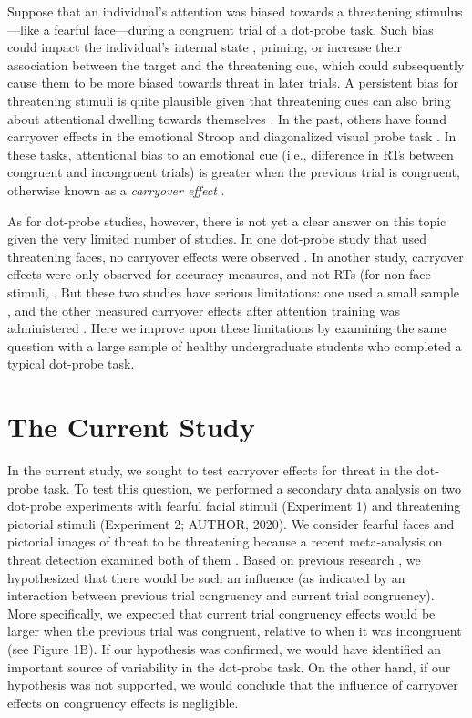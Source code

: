 \documentclass[issue,header,twocolumn,empirical, authordate,10pt]{jote-new-article}
\begin{document}
Suppose that an individual's attention was biased towards a threatening stimulus—like a fearful face—during a congruent trial of a dot-probe task. Such bias could impact the individual's internal state \parencite{Panksepp2011}, priming, or increase their association between the target and the threatening cue, which could subsequently cause them to be more biased towards threat in later trials. A persistent bias for threatening stimuli is quite plausible given that threatening cues can also bring about attentional dwelling towards themselves \parencite{Carlson2014, Fox2001}. In the past, others have found carryover effects in the emotional Stroop \parencite{Cane2009, Clarke2015, Waters2005, Wilson2007} and diagonalized visual probe task \parencite{Gladwin2019, Gladwin2020, Gladwin2019a}. In these tasks, attentional bias to an emotional cue (i.e., difference in RTs between congruent and incongruent trials) is greater when the previous trial is congruent, otherwise known as a \emph{carryover effect } \parencite{Gladwin2019}.



As for dot-probe studies, however, there is not yet a clear answer on this topic given the very limited number of studies. In one dot-probe study that used threatening faces, no carryover effects were observed \parencite{Hill2016}. In another study, carryover effects were only observed for accuracy measures, and not RTs (for non-face stimuli, \parencite{Gladwin2017}. But these two studies have serious limitations: one used a small sample \parencite{Gladwin2017}, and the other measured carryover effects after attention training was administered \parencite{Hill2016}. Here we improve upon these limitations by examining the same question with a large sample of healthy undergraduate students who completed a typical dot-probe task.


\section{The Current Study}

In the current study, we sought to test carryover effects for threat in the dot-probe task. To test this question, we performed a secondary data analysis on two dot-probe experiments with fearful facial stimuli (Experiment 1) and threatening pictorial stimuli (Experiment 2; AUTHOR, 2020). We consider fearful faces and pictorial images of threat to be threatening because a recent meta-analysis on threat detection examined both of them \parencite{Hedger2016}. Based on previous research \parencite{Gladwin2019b, Gladwin2020a}, we hypothesized that there would be such an influence (as indicated by an interaction between previous trial congruency and current trial congruency). More specifically, we expected that current trial congruency effects would be larger when the previous trial was congruent, relative to when it was incongruent (see Figure 1B). If our hypothesis was confirmed, we would have identified an important source of variability in the dot-probe task. On the other hand, if our hypothesis was not supported, we would conclude that the influence of carryover effects on congruency effects is negligible.
\end{document}
